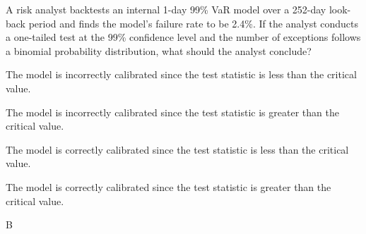 \documentclass{article}
\newcounter{question} %
\begin{document}
\begin{question}
    A risk analyst backtests an internal 1-day 99\% VaR model over a 252-day look-back period and finds the model's failure rate to be 2.4\%. If the analyst conducts a one-tailed test at the 99\% confidence level and the number of exceptions follows a binomial probability distribution, what should the analyst conclude?
\end{question}

\begin{choices}
    \item The model is incorrectly calibrated since the test statistic is less than the critical value.
    \item The model is incorrectly calibrated since the test statistic is greater than the critical value.
    \item The model is correctly calibrated since the test statistic is less than the critical value.
    \item The model is correctly calibrated since the test statistic is greater than the critical value.
\end{choices}

\begin{correctanswer}
    B
\end{correctanswer}
\end{document}
